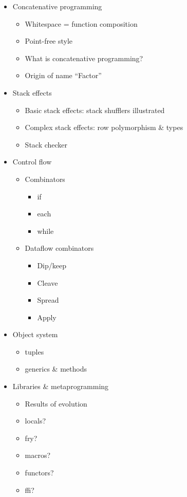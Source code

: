 \begin{itemize}

\item Concatenative programming
      \begin{itemize}
        \item Whitespace = function composition
        \item Point-free style
        \item What is concatenative programming?
        \item Origin of name ``Factor''
      \end{itemize}

\item Stack effects
      \begin{itemize}
        \item Basic stack effects: stack shufflers illustrated
        \item Complex stack effects: row polymorphism \& types
        \item Stack checker
      \end{itemize}

\item Control flow
      \begin{itemize}
        \item Combinators
              \begin{itemize}
                \item if
                \item each
                \item while
              \end{itemize}
        \item Dataflow combinators
              \begin{itemize}
                \item Dip/keep
                \item Cleave
                \item Spread
                \item Apply
              \end{itemize}
      \end{itemize}

\item Object system
      \begin{itemize}
        \item tuples
        \item generics \& methods
      \end{itemize}

\item Libraries \& metaprogramming
      \begin{itemize}
        \item Results of evolution
        \item locals?
        \item fry?
        \item macros?
        \item functors?
        \item ffi?
      \end{itemize}

\end{itemize}



